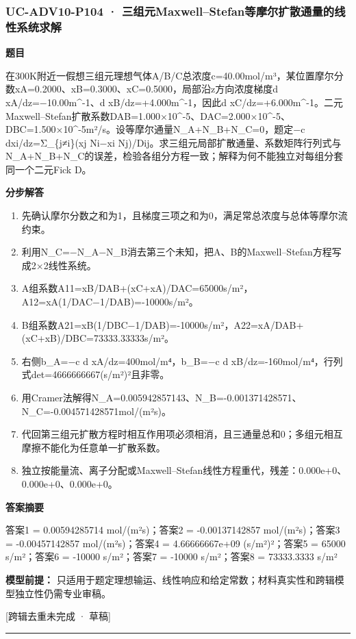 \documentclass[UTF8,11pt,a4paper]{ctexart}
\begin{document}
\subsubsection*{UC-ADV10-P104 · 三组元Maxwell–Stefan等摩尔扩散通量的线性系统求解}
\noindent\textbf{题目}\par
在300K附近一假想三组元理想气体A/B/C总浓度c=40.00mol/m³，某位置摩尔分数xA=0.2000、xB=0.3000、xC=0.5000，局部沿z方向浓度梯度d xA/dz=−10.00m\textasciicircum{}-1、d xB/dz=+4.000m\textasciicircum{}-1，因此d xC/dz=+6.000m\textasciicircum{}-1。二元Maxwell–Stefan扩散系数DAB=1.000×10\textasciicircum{}-5、DAC=2.000×10\textasciicircum{}-5、DBC=1.500×10\textasciicircum{}-5m²/s。设等摩尔通量N\_A+N\_B+N\_C=0，题定−c dxi/dz=Σ\_\{j≠i\}(xj Ni−xi Nj)/Dij。求三组元局部扩散通量、系数矩阵行列式与N\_A+N\_B+N\_C的误差，检验各组分方程一致；解释为何不能独立对每组分套同一个二元Fick D。\par
\medskip\noindent\textbf{分步解答}
\begin{enumerate}
\item 先确认摩尔分数之和为1，且梯度三项之和为0，满足常总浓度与总体等摩尔流约束。
\item 利用N\_C=−N\_A−N\_B消去第三个未知，把A、B的Maxwell–Stefan方程写成2×2线性系统。
\item A组系数A11=xB/DAB+(xC+xA)/DAC=65000s/m²，A12=xA(1/DAC−1/DAB)=-10000s/m²。
\item B组系数A21=xB(1/DBC−1/DAB)=-10000s/m²，A22=xA/DAB+(xC+xB)/DBC=73333.33333s/m²。
\item 右侧b\_A=−c d xA/dz=400mol/m⁴，b\_B=−c d xB/dz=-160mol/m⁴，行列式det=4666666667(s/m²)²且非零。
\item 用Cramer法解得N\_A=0.005942857143、N\_B=-0.001371428571、N\_C=-0.004571428571mol/(m²s)。
\item 代回第三组元扩散方程时相互作用项必须相消，且三通量总和0；多组元相互摩擦不能化为任意单一扩散系数。
\item 独立按能量流、离子分配或Maxwell–Stefan线性方程重代，残差：0.000e+0、0.000e+0、0.000e+0。
\end{enumerate}
\noindent\textbf{答案摘要}\par
答案1 = 0.00594285714 mol/(m²s)；答案2 = -0.00137142857 mol/(m²s)；答案3 = -0.00457142857 mol/(m²s)；答案4 = 4.66666667e+09 (s/m²)²；答案5 = 65000 s/m²；答案6 = -10000 s/m²；答案7 = -10000 s/m²；答案8 = 73333.3333 s/m²\par
\noindent\textbf{模型前提：}
只适用于题定理想输运、线性响应和给定常数；材料真实性和跨辑模型独立性仍需专业审稿。\par
\noindent\textcolor{red!65!black}{[跨辑去重未完成 · 草稿]} \par
\medskip\hrule\medskip
{}
\end{document}
